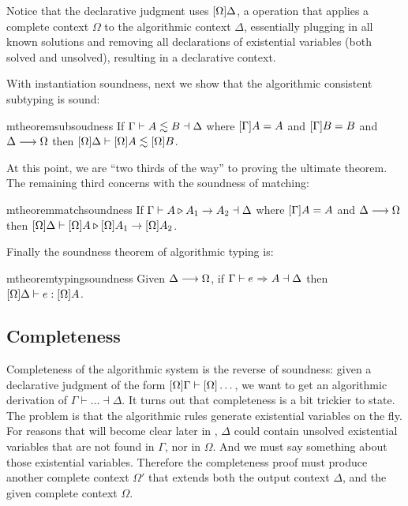 Notice that the declarative judgment uses $[\Omega]\Delta$, a
operation that applies a complete context $\Omega$ to the algorithmic context
$\Delta$, essentially plugging in all known solutions and removing all
declarations of existential variables (both solved and unsolved), resulting in a
declarative context.

With instantiation soundness, next we show that the algorithmic consistent
subtyping is sound:

\begin{restatable}{mtheorem}{subsoudness} \label{thm:sub_soundness}%
  If $\Gamma \vdash A \lesssim B \dashv \Delta$ where $[\Gamma]A = A$ and
  $[\Gamma]B = B$ and $\Delta \longrightarrow \Omega$ then
  $[\Omega]\Delta \vdash [\Omega]A \lesssim
  [\Omega]B$.
\end{restatable}

At this point, we are ``two thirds of the way'' to proving the ultimate theorem.
The remaining third concerns with the soundness of matching:

\begin{restatable}{mtheorem}{matchsoundness}  \label{thm:match_soundness}%
  If $\Gamma \vdash A \triangleright A_1 \to A_2 \dashv \Delta$ where
  $[\Gamma]A = A$ and $\Delta \longrightarrow \Omega$ then
  $[\Omega]\Delta \vdash [\Omega]A \triangleright
  [\Omega]A_1 \to [\Omega]A_2$.
\end{restatable}


Finally the soundness theorem of algorithmic typing is:

\begin{restatable}{mtheorem}{typingsoundness} \label{thm:type_sound}
  Given $\Delta \longrightarrow \Omega$, if $\Gamma \vdash e {~\Rightarrow~} A \dashv \Delta$ then
  $[\Omega]\Delta \vdash e : [\Omega]A$.
\end{restatable}


\subsection{Completeness}

Completeness of the algorithmic system is the reverse of soundness: given a
declarative judgment of the form $[\Omega]\Gamma \vdash
[\Omega]\dots $, we want to get an algorithmic derivation of $\Gamma
\vdash \dots \dashv \Delta$. It turns out that completeness is a bit trickier to
state. The problem is that the algorithmic rules generate existential variables
on the fly. For reasons that will become clear later in
, $\Delta$ could contain unsolved existential
variables that are not found in $\Gamma$, nor in $\Omega$. And we must say
something about those existential variables. Therefore the completeness proof
must produce another complete context $\Omega'$ that extends both the output
context $\Delta$, and the given complete context $\Omega$.

